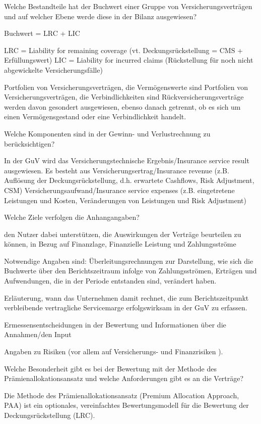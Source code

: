 Welche Bestandteile hat der Buchwert einer Gruppe von Versicherungsverträgen und 
auf welcher Ebene werde diese in der Bilanz ausgewiesen?

Buchwert = LRC + LIC

LRC = Liability for remaining coverage (vt. Deckungsrückstellung = CMS + Erfüllungswert)
LIC = Liability for incurred claims (Rückstellung für noch nicht abgewickelte Versicherungsfälle)

Portfolien von Versicherungsverträgen, die Vermögenswerte sind
Portfolien von Versicherungsverträgen, die Verbindlichkeiten sind
Rückversicherungsverträge werden davon gesondert ausgewiesen, ebenso danach getrennt, ob es sich um einen
Vermögensgestand oder eine Verbindlichkeit handelt.

Welche Komponenten sind in der Gewinn- und Verlustrechnung zu berücksichtigen?

In der GuV wird das Versicherungstechnische Ergebnis/Insurance service result ausgewiesen.
Es besteht aus
Versicherungsertrag/Insurance revenue 
(z.B. Auflösung der Deckungsrückstellung, d.h. erwartete Cashflows, Risk Adjustment, CSM)
Versicherungsaufwand/Insurance service expenses 
(z.B. eingetretene Leistungen und Kosten, Veränderungen von Leistungen und Risk Adjustment)


Welche Ziele verfolgen die Anhangangaben?

den Nutzer dabei unterstützen, die Auswirkungen der Verträge beurteilen zu
können, in Bezug auf Finanzlage, Finanzielle Leistung und Zahlungsströme

Notwendige Angaben sind:
Überleitungsrechnungen zur Darstellung, wie sich die Buchwerte über den Berichtszeitraum infolge von Zahlungsströmen,
Erträgen und Aufwendungen, die in der Periode entstanden sind, verändert haben.

Erläuterung, wann das Unternehmen damit rechnet, die zum Berichtszeitpunkt verbleibende vertragliche Servicemarge
erfolgswirksam in der GuV zu erfassen.

Ermessensentscheidungen in der Bewertung und Informationen über die Annahmen/den Input

Angaben zu Risiken (vor allem auf Versicherungs- und Finanzrisiken ).


Welche Besonderheit gibt es bei der Bewertung mit der Methode des Prämienallokationsansatz und welche Anforderungen gibt
es an die Verträge?

Die Methode des Prämienallokationsansatz (Premium Allocation Approach, PAA) ist ein optionales, vereinfachtes
Bewertungsmodell für die Bewertung der Deckungsrückstellung (LRC).

